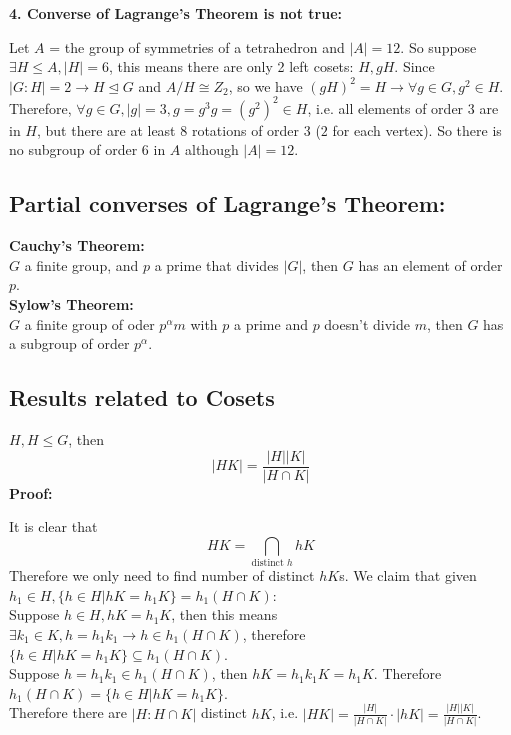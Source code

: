 \documentclass{article}
\begin{document}
\textbf{4. Converse of Lagrange's Theorem is not true:}
\begin{addmargin}[1em]{0em}
Let $A$ = the group of symmetries of a tetrahedron and $|A| = 12$. So suppose $\exists H \leq A, |H| = 6$, this means there are only 2 left cosets: $H, gH$. Since $|G:H| = 2 \rightarrow H \trianglelefteq G$ and $A/H \cong Z_2$, so we have $(gH)^2 = H \rightarrow \forall g \in G, g^2 \in H$.\\
Therefore, $\forall g \in G, |g| = 3, g = g^3g = (g^2)^2 \in H$, i.e. all elements of order $3$ are in $H$, but there are at least $8$ rotations of order $3$ ($2$ for each vertex). So there is no subgroup of order $6$ in $A$ although $|A| = 12$.
\end{addmargin}
\subsection{Partial converses of Lagrange's Theorem:}
\textbf{Cauchy's Theorem:}\\
$G$ a finite group, and $p$ a prime that divides $|G|$, then $G$ has an element of order $p$.\\
\textbf{Sylow's Theorem:}\\
$G$ a finite group of oder $p^\alpha m$ with $p$ a prime and $p$ doesn't divide $m$, then $G$ has a subgroup of order $p^\alpha$.\\
\subsection{Results related to Cosets}
$H, H \leq G$, then
\begin{equation*}
    |HK| = \frac{|H||K|}{|H\cap K|}
\end{equation*}
\textbf{Proof:}
\begin{addmargin}[1em]{0em}
It is clear that
\begin{equation*}
    HK = \bigcap_{\textrm{distinct }h} hK
\end{equation*}
Therefore we only need to find number of distinct $hK$s. We claim that given $h_1 \in H, \{h \in H | hK = h_1K\} = h_1(H \cap K)$:\\
Suppose $h \in H, hK = h_1K$, then this means $\exists k_1 \in K,  h = h_1k_1 \rightarrow h \in h_1(H\cap K)$, therefore $\{h \in H | hK = h_1K\} \subseteq h_1(H \cap K)$.\\
Suppose $h = h_1k_1 \in h_1(H \cap K)$, then $hK = h_1k_1K = h_1K$. Therefore $h_1(H \cap K) = \{h \in H | hK = h_1K\}$.\\
Therefore there are $|H:H \cap K|$ distinct $hK$, i.e. $|HK| = \frac{|H|}{|H \cap K|} \cdot |hK| = \frac{|H||K|}{|H \cap K|}$.
\end{addmargin}
\end{document}
